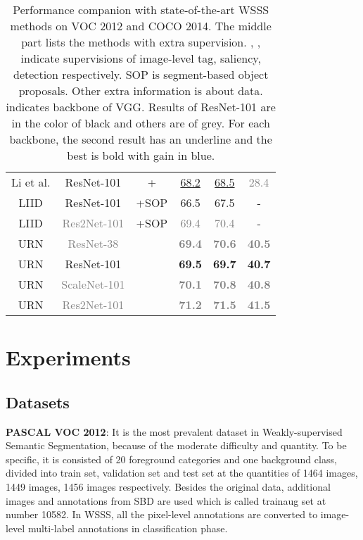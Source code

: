 \begin{table*}[h]
\begin{centering}
\begin{tabular}{ccc|ccc}
Li et al. \cite{li2020group} & ResNet-101 & + & \underline{68.2} & \underline{68.5} & \textcolor{grey}{28.4}\tabularnewline
LIID \cite{liu2020leveraging} & ResNet-101 & +SOP & 66.5 & 67.5 & -\tabularnewline
LIID \cite{liu2020leveraging} & \textcolor{grey}{Res2Net-101} & +SOP & \textcolor{grey}{69.4} & \textcolor{grey}{70.4} & -\tabularnewline
\hline
URN & \textcolor{grey}{ResNet-38} &  & \textcolor{grey}{\textbf{69.4}} & \textcolor{grey}{\textbf{70.6}} & \textcolor{grey}{\textbf{40.5}}\tabularnewline
URN & ResNet-101 &  & \textbf{69.5} & \textbf{69.7} & \textbf{40.7}\tabularnewline
URN & \textcolor{grey}{ScaleNet-101} &  & \textcolor{grey}{\textbf{70.1}} & \textcolor{grey}{\textbf{70.8}} & \textcolor{grey}{\textbf{40.8}}\tabularnewline
URN & \textcolor{grey}{Res2Net-101} &  & \textcolor{grey}{\textbf{71.2}} & \textcolor{grey}{\textbf{71.5}} & \textcolor{grey}{\textbf{41.5}}\tabularnewline
\hline 
\end{tabular}
\par\end{centering}
\caption{\label{tab:results}Performance companion with state-of-the-art WSSS methods on VOC 2012 and COCO 2014. The middle part lists the methods with extra supervision. , ,  indicate supervisions of image-level tag, saliency, detection respectively. SOP is segment-based object proposals. Other extra information is about data.  indicates backbone of VGG. Results of ResNet-101 are in the color of black and others are of grey. For each backbone, the second result has an underline and the best is bold with gain in blue.}
\end{table*}


\section{Experiments}
\subsection{Datasets}
\textbf{PASCAL VOC 2012}: It is the most prevalent dataset in Weakly-supervised Semantic Segmentation, because of the moderate difficulty and quantity. To be specific, it is consisted of 20 foreground categories and one background class, divided into train set, validation set and test set at the quantities of 1464 images, 1449 images, 1456 images respectively. Besides the original data, additional images and annotations from SBD \cite{hariharan2011semantic} are used which is called trainaug set at number 10582. In WSSS, all the pixel-level annotations are converted to image-level multi-label annotations in classification phase.

